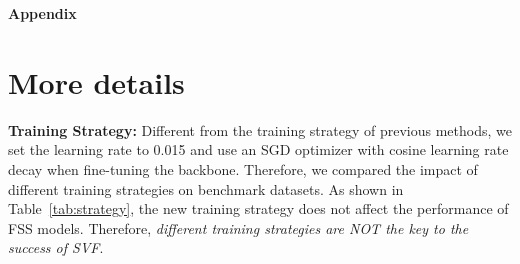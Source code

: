 \documentclass{article}
\begin{document}
{\small


}





























\clearpage
\appendix
\vspace{-1.0em}
\noindent
{\Large {\textbf{Appendix}}}

\section{More details}
\textbf{Training Strategy:} Different from the training strategy of previous methods, we set the learning rate to 0.015 and use an SGD optimizer with cosine learning rate decay when fine-tuning the backbone. Therefore, we compared the impact of different training strategies on benchmark datasets. As shown in Table~\ref{tab:strategy}, the new training strategy does not affect the performance of FSS models.
Therefore, {\em different training strategies are NOT the key to the success of SVF}.
\end{document}
